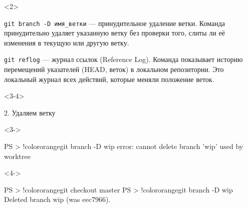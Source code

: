 \documentclass[9pt, aspectratio=1610]{beamer}
\begin{document}
\begin{frame}[t,fragile]
\begin{columns}[onlytextwidth]
\begin{column}[T]{\linewidth}
\begin{minipage}[t][5.2cm][t]{\textwidth}
\begin{onlyenv}
				\end{onlyenv}	
				
				\begin{onlyenv}<2>
					
					\begin{alertblock}{\Verb|git branch -D имя_ветки| --- }
						принудительное удаление ветки. Команда принудительно удаляет указанную ветку без проверки того, слиты ли её изменения в текущую или другую ветку.
					\end{alertblock}
					
					\begin{alertblock}{\Verb|git reflog| --- }
						журнал ссылок (Reference Log). Команда показывает историю перемещений указателей (HEAD, веток) в локальном репозитории. Это локальный журнал всех действий, которые меняли положение веток.
					\end{alertblock}
					
				\end{onlyenv}
				
				
				\begin{onlyenv}<3-4>
					
					2. Удаляем ветку
					
					\begin{uncoverenv}<3->
						
						\begin{VerbatimCmd}[gobble=7]
							
							PS > !color{orange}git branch -D wip    
							error: cannot delete branch 'wip' used by worktree
							
						\end{VerbatimCmd}
						
					\end{uncoverenv}
					\begin{uncoverenv}<4->
						
						\begin{VerbatimCmd}[gobble=7]
							
							PS > !color{orange}git checkout master    
							PS > !color{orange}git branch -D wip 
							Deleted branch wip (was eec7966).  
							
						\end{VerbatimCmd}
						
					\end{uncoverenv}
					
				
					
					
				\end{onlyenv}
				

\end{minipage}
\end{column}
\end{columns}
\end{frame}
\end{document}
